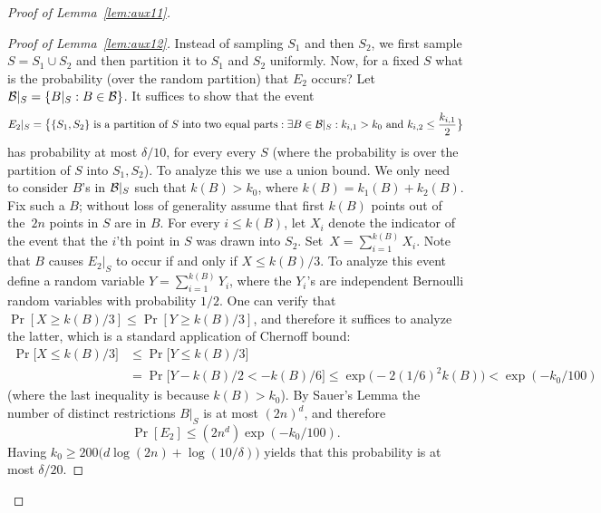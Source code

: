 \documentclass{article}
\newcommand{\B}{{\cal B}}
\newcommand{\samp}{S}
\newcommand{\comment}[3]{\marginpar{\textcolor{#2}{#1: #3}}}
\newcommand{\shay}[1]{\comment{Shay}{red}{#1}}
\begin{document}
\begin{proof}[Proof of Lemma~\ref{lem:aux11}]
\begin{proof}[Proof of Lemma~\ref{lem:aux12}]
Instead of sampling $\samp_1$ and then $\samp_2$,
we first sample $\samp=\samp_1\cup \samp_2$ and 
then partition it to $\samp_1$ and $\samp_2$ uniformly.
Now, for a fixed $\samp$ what is the probability (over the random partition)
that $E_2$ occurs?
Let $\B|_{\samp} = \{B|_{\samp} : B\in\B\}$.
It suffices to show that the event
\[E_2|_{\samp} = 
\bigl\{ \{S_1,S_2\}\text{ is a partition of $S$ into two equal parts} :
\exists {B\in\B|_{\samp}}:
  k_{i,1}>k_0 \mbox{ and } k_{i,2} \leq \frac{k_{i,1}}{2}
  \bigr\}
\]
has probability at most $\delta/10$, for every every $\samp$ 
(where the probability is over the partition of $\samp$ into $\samp_1,\samp_2$).
To analyze this we use a union bound. 
We only need to consider $B$'s in $\B|_{\samp}$ such that $k(B) > k_0$,
where $k(B) = k_{1}(B)+ k_{2}(B)$.
Fix such a $B$;
without loss of generality assume that
first $k(B)$ points out of the~$2n$
points in $S$ are in $B$. 
For every $i\leq k(B)$,
let $X_i$ denote the indicator of the event
that the $i$'th point in $S$ was drawn into $S_2$.
Set~$X=\sum_{i=1}^{k(B)}X_i$.
Note that $B$ causes $E_2|_{\samp}$ to occur if and only if $X\leq k(B)/3$.
To analyze this event define a random variable $Y=\sum_{i=1}^{k(B)}Y_i$,
where the $Y_i$'s are independent Bernoulli random variables with probability $1/2$.
One can verify that $\Pr[X\geq k(B)/3]\leq \Pr[Y\geq k(B)/3]$,
and therefore it suffices to analyze the latter, 
which is a standard application of Chernoff bound:
\shay{Here we should refer to the statement that sampling without repetitions is more concentrated.}
\begin{align*}
\Pr\bigl[X\leq k(B)/3\bigr]&\leq 
\Pr\bigl[Y\leq k(B)/3\bigr]\\
&=\Pr\bigl[Y- k(B)/2 < -k(B)/6\bigr]\leq
\exp\bigl(-2(1/6)^2k(B)\bigr) < \exp(-k_0/100)
\end{align*}
(where the last inequality is because $k(B) > k_0$).
By Sauer's Lemma
the number of distinct restrictions $B|_S$ is at most $(2n)^d$, and therefore 
\[\Pr[E_2]\leq (2n^d)\exp(-k_0/100).\]
Having $k_0\geq 200\bigl(d\log(2n) + \log(10/\delta)\bigr)$ yields
that this probability is at most $\delta/20$.
\end{proof}


\end{proof}
\end{document}
